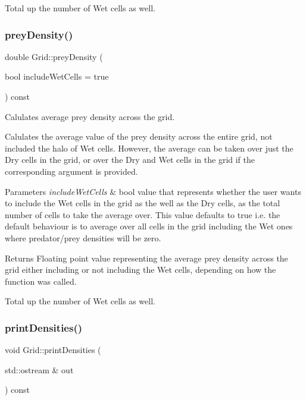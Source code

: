 Total up the number of Wet cells as well. \mbox{\label{class_grid_a7dc8ae18c31e8e680f6369d7c07ea881}} 
\subsubsection{\texorpdfstring{prey\+Density()}{preyDensity()}}
{\footnotesize\ttfamily double Grid\+::prey\+Density (\begin{DoxyParamCaption}\item[{bool}]{include\+Wet\+Cells = {\ttfamily true} }\end{DoxyParamCaption}) const}



Calulates average prey density across the grid. 

Calulates the average value of the prey density across the entire grid, not included the halo of Wet cells. However, the average can be taken over just the Dry cells in the grid, or over the Dry and Wet cells in the grid if the corresponding argument is provided.


\begin{DoxyParams}{Parameters}
{\em include\+Wet\+Cells} & bool value that represents whether the user wants to include the Wet cells in the grid as the well as the Dry cells, as the total number of cells to take the average over. This value defaults to true i.\+e. the default behaviour is to average over all cells in the grid including the Wet ones where predator/prey densities will be zero.\\
\hline
\end{DoxyParams}
\begin{DoxyReturn}{Returns}
Floating point value representing the average prey density across the grid either including or not including the Wet cells, depending on how the function was called. 
\end{DoxyReturn}
Total up the number of Wet cells as well. \mbox{\label{class_grid_a4971cb9d47440bc63488993d5647f943}} 
\subsubsection{\texorpdfstring{print\+Densities()}{printDensities()}}
{\footnotesize\ttfamily void Grid\+::print\+Densities (\begin{DoxyParamCaption}\item[{std\+::ostream \&}]{out }\end{DoxyParamCaption}) const}



